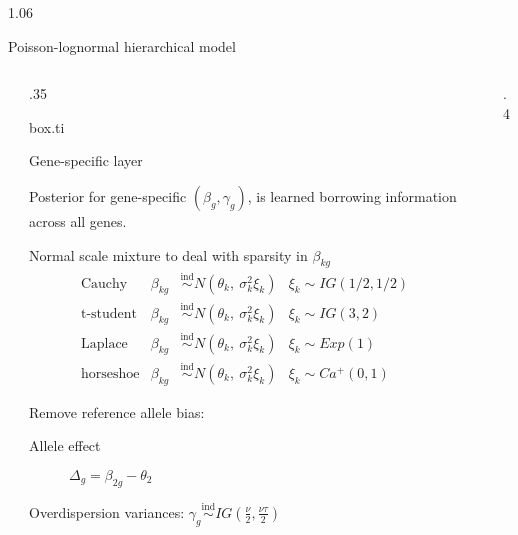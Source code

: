 \documentclass[final]{beamer}
\newlength{\twocolwid}
\newlength{\threecolwid}
\begin{document}
\begin{frame}
\begin{columns}[t,totalwidth=\threecolwid]
\begin{column}{1.06\twocolwid}
\begin{alertblock}{Poisson-lognormal hierarchical model}
\begin{columns}[t, totalwidth = \twocolwid]
\begin{column}{.5cm}\end{column}  %

\begin{column}{.35\twocolwid}

\begin{beamercolorbox}{box.ti}

\vspace{.05cm}

Gene-specific layer

\vspace{.05cm}

\end{beamercolorbox}
\vspace{.1cm}

Posterior for gene-specific $(\beta_g, \gamma_g)$, is learned borrowing information across all genes. 
\vspace{1cm}

Normal scale mixture to deal with sparsity in $\beta_{kg}$
\[
\begin{array}{llll}
\mbox{Cauchy} & \beta_{kg} & \stackrel{\text{ind}}{\sim} N(\theta_k, \ \sigma_k^2\xi_k ) & \xi_k \sim IG(1/2, 1/2) \\
\mbox{t-student} & \beta_{kg} & \stackrel{\text{ind}}{\sim} N(\theta_k, \ \sigma_k^2\xi_k ) & \xi_k \sim IG(3, 2) \\
\mbox{Laplace} & \beta_{kg} & \stackrel{\text{ind}}{\sim} N(\theta_k, \ \sigma_k^2\xi_k ) & \xi_k \sim Exp(1)  \\
\mbox{horseshoe} & \beta_{kg} & \stackrel{\text{ind}}{\sim} N(\theta_k, \ \sigma_k^2\xi_k ) & \xi_k \sim Ca^{+}(0,1)
\end{array} 
\]
\vspace{1cm}

Remove reference allele bias:
\begin{description}
\item[Allele effect] $\Delta_g = \beta_{2g}-\theta_2$
\end{description}
\vspace{1cm}

Overdispersion variances: $\gamma_g  \stackrel{\text{ind}}{\sim} IG(\frac{\nu}{2}, \frac{\nu\tau}{2})$
\end{column}
\begin{column}{.5cm}\end{column}  %

\begin{column}{.4\twocolwid}


\end{column}
\end{columns}
\end{alertblock}
\end{column}
\end{columns}
\end{frame}
\end{document}
